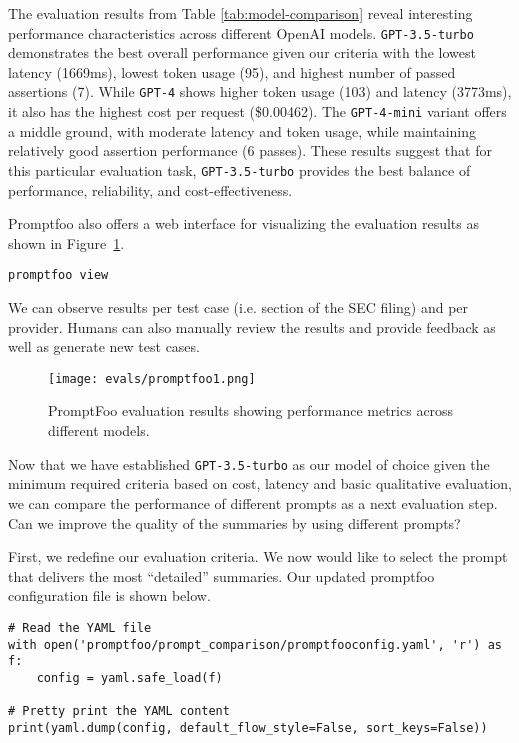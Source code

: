 The evaluation results from Table \ref{tab:model-comparison} reveal interesting performance characteristics across different OpenAI models. \texttt{GPT-3.5-turbo} demonstrates the best overall performance given our criteria with the lowest latency (1669ms), lowest token usage (95), and highest number of passed assertions (7). While \texttt{GPT-4} shows higher token usage (103) and latency (3773ms), it also has the highest cost per request (\$0.00462). The \texttt{GPT-4-mini} variant offers a middle ground, with moderate latency and token usage, while maintaining relatively good assertion performance (6 passes). These results suggest that for this particular evaluation task, \texttt{GPT-3.5-turbo} provides the best balance of performance, reliability, and cost-effectiveness.

Promptfoo also offers a web interface for visualizing the evaluation results as shown in Figure~\ref{fig:promptfoo1}. 

\begin{verbatim}
promptfoo view
\end{verbatim}

We can observe results per test case (i.e. section of the SEC filing) and per provider. Humans can also manually review the results and provide feedback as well as generate new test cases.

\begin{figure}[h]
\centering
\texttt{[image: evals/promptfoo1.png]}
\caption{PromptFoo evaluation results showing performance metrics across different models.}
\label{fig:promptfoo1}
\end{figure}

Now that we have established \texttt{GPT-3.5-turbo} as our model of choice given the minimum required criteria based on cost, latency and basic qualitative evaluation, we can compare the performance of different prompts as a next evaluation step. Can we improve the quality of the summaries by using different prompts?

First, we redefine our evaluation criteria. We now would like to select the prompt that delivers the most ``detailed'' summaries. Our updated promptfoo configuration file is shown below.

\begin{verbatim}
# Read the YAML file
with open('promptfoo/prompt_comparison/promptfooconfig.yaml', 'r') as f:
    config = yaml.safe_load(f)

# Pretty print the YAML content
print(yaml.dump(config, default_flow_style=False, sort_keys=False))
\end{verbatim}

